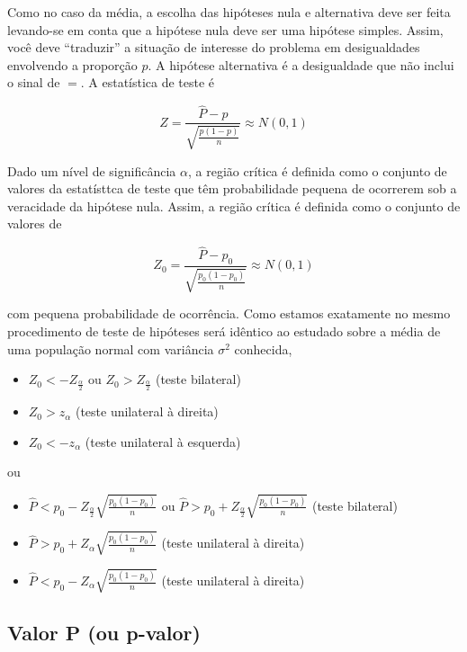 \documentclass[
]{book}
\providecommand{\tightlist}{%
  \setlength{\itemsep}{0pt}\setlength{\parskip}{0pt}}
\begin{document}
Como no caso da média, a escolha das hipóteses nula e alternativa deve ser feita levando-se em conta que a hipótese nula deve ser uma hipótese simples. Assim, você deve ``traduzir'' a situação de interesse do problema em desigualdades envolvendo a proporção \(p\). A hipótese alternativa é a desigualdade que não inclui o sinal de \(=\). A estatística de teste é

\[Z=\frac{\hat P-p}{\sqrt{\frac{p(1-p)}{n}}}\approx N(0,1)\]

Dado um nível de significância \(\alpha\), a região crítica é definida como o conjunto de valores da estatísttca de teste que têm probabilidade pequena de ocorrerem sob a veracidade da hipótese nula. Assim, a região crítica é definida como o conjunto de valores de

\[Z_0=\frac{\hat P-p_0}{\sqrt{\frac{p_0(1-p_0)}{n}}}\approx N(0,1)\]

com pequena probabilidade de ocorrência. Como estamos exatamente no mesmo procedimento de teste de hipóteses será idêntico ao estudado sobre a média de uma população normal com variância \(\sigma^2\) conhecida,

\begin{itemize}
\tightlist
\item
  \(Z_0 < -Z_\frac{\alpha}{2}\) ou \(Z_0>Z_\frac{\alpha}{2}\) (teste bilateral)
\item
  \(Z_0 > z_\alpha\) (teste unilateral à direita)
\item
  \(Z_0 < -z_\alpha\) (teste unilateral à esquerda)
\end{itemize}

ou

\begin{itemize}
\tightlist
\item
  \(\hat P < p_0-Z_\frac{\alpha}{2}\sqrt{\frac{p_0(1-p_0)}{n}}\) ou \(\hat P > p_0+Z_\frac{\alpha}{2}\sqrt{\frac{p_0(1-p_0)}{n}}\) (teste bilateral)
\item
  \(\hat P > p_0+Z_\alpha\sqrt{\frac{p_0(1-p_0)}{n}}\) (teste unilateral à direita)
\item
  \(\hat P < p_0-Z_\alpha\sqrt{\frac{p_0(1-p_0)}{n}}\) (teste unilateral à direita)
\end{itemize}

\hypertarget{valor-p-ou-p-valor-2}{%
\subsection{Valor P (ou p-valor)}\label{valor-p-ou-p-valor-2}}
\end{document}
